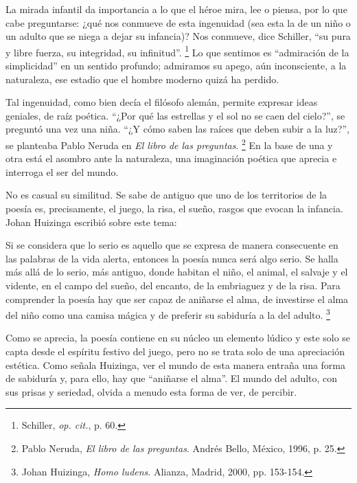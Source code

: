\documentclass[14pt,twoside,final]{extbook} %
\let\oldfootnote\footnote
\renewcommand\footnote[1]{%
\oldfootnote{\hspace{1mm}#1}}
\begin{document}
La mirada infantil da importancia a lo que el héroe mira, lee o piensa, por lo que cabe preguntarse: ¿qué nos conmueve de esta ingenuidad (sea esta la de un niño o un adulto que se niega a dejar su infancia)? Nos conmueve, dice Schiller, ``su pura y libre fuerza, su integridad, su infinitud''.\footnote{Schiller, \emph{op. cit.}, p. 60.} Lo que sentimos es ``admiración de la simplicidad'' en un sentido profundo; admiramos su apego, aún inconsciente, a la naturaleza, ese estadio que el hombre moderno quizá ha perdido.

Tal ingenuidad, como bien decía el filósofo alemán, permite expresar ideas geniales, de raíz poética. ``¿Por qué las estrellas y el sol no se caen del cielo?'', se preguntó una vez una niña. ``¿Y cómo saben las raíces que deben subir a la luz?'', se planteaba Pablo Neruda en \emph{El libro de las preguntas}.\footnote{Pablo Neruda, \emph{El libro de las preguntas}. Andrés Bello, México, 1996, p. 25.} En la base de una y otra está el asombro ante la naturaleza, una imaginación poética que aprecia e interroga el ser del mundo.

No es casual su similitud. Se sabe de antiguo que uno de los territorios de la poesía es, precisamente, el juego, la risa, el sueño, rasgos que evocan la infancia. Johan Huizinga escribió sobre este tema:
\begin{quoting}
Si se considera que lo serio es aquello que se expresa de manera consecuente en las palabras de la vida alerta, entonces la poesía nunca será algo serio. Se halla más allá de lo serio, más antiguo, donde habitan el niño, el animal, el salvaje y el vidente, en el campo del sueño, del encanto, de la embriaguez y de la risa. Para comprender la poesía hay que ser capaz de aniñarse el alma, de investirse el alma del niño como una camisa mágica y de preferir su sabiduría a la del adulto.\footnote{Johan Huizinga, \emph{Homo ludens}. Alianza, Madrid, 2000, pp. 153-154.}
\end{quoting}
Como se aprecia, la poesía contiene en su núcleo un elemento lúdico y este solo se capta desde el espíritu festivo del juego, pero no se trata solo de una apreciación estética. Como señala Huizinga, ver el mundo de esta manera entraña una forma de sabiduría y, para ello, hay que ``aniñarse el alma''. El mundo del adulto, con sus prisas y seriedad, olvida a menudo esta forma de ver, de percibir.
\end{document}
